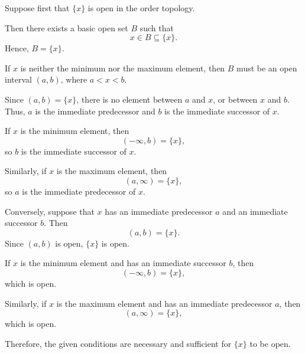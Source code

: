 Suppose first that $\{x\}$ is open in the order
topology.

Then there exists a basic open set $B$ such that
\[
x\in B\subseteq\{x\}.
\]
Hence, $B=\{x\}$.

If $x$ is neither the minimum nor the maximum
element, then $B$ must be an open interval
$(a,b)$, where $a<x<b$.

Since $(a,b)=\{x\}$, there is no element between
$a$ and $x$, or between $x$ and $b$.
Thus, $a$ is the immediate predecessor and $b$
is the immediate successor of $x$.

If $x$ is the minimum element, then
\[
(-\infty,b)=\{x\},
\]
so $b$ is the immediate successor of $x$.

Similarly, if $x$ is the maximum element, then
\[
(a,\infty)=\{x\},
\]
so $a$ is the immediate predecessor of $x$.

Conversely, suppose that $x$ has an immediate
predecessor $a$ and an immediate successor $b$.
Then
\[
(a,b)=\{x\}.
\]
Since $(a,b)$ is open, $\{x\}$ is open.

If $x$ is the minimum element and has an
immediate successor $b$, then
\[
(-\infty,b)=\{x\},
\]
which is open.

Similarly, if $x$ is the maximum element and has
an immediate predecessor $a$, then
\[
(a,\infty)=\{x\},
\]
which is open.

Therefore, the given conditions are necessary
and sufficient for $\{x\}$ to be open.